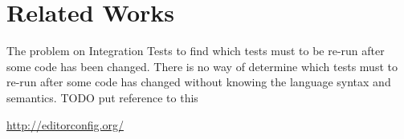 %

%
%
%
%
%
%
%
%


    \section{Related Works}

    The problem on Integration Tests to find which tests must to be re\hyp{}run
    after some code has been changed. There is no way of determine which
    tests must to re\hyp{}run after some code has changed without knowing the
    language syntax and semantics. TODO put reference to this

    \url{http://editorconfig.org/}

